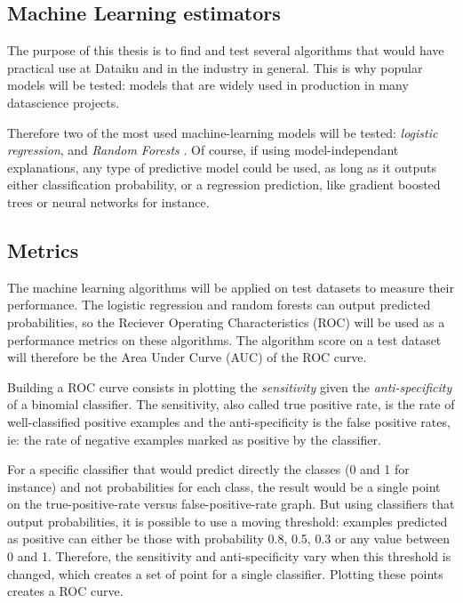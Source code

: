 \documentclass[a4paper,11pt]{kth-mag}
\begin{document}
\subsection{Machine Learning estimators}

The purpose of this thesis is to find and test several algorithms that would have practical use at Dataiku and in the industry in general. This is why popular models will be tested: models that are widely used in production in many datascience projects.

Therefore two of the most used machine-learning models will be tested: \textit{logistic regression}, and \textit{Random Forests} \cite{Breiman2001}. Of course, if using model-independant explanations, any type of predictive model could be used, as long as it outputs either classification probability, or a regression prediction, like gradient boosted trees or neural networks for instance.

\subsection{Metrics}

The machine learning algorithms will be applied on test datasets to measure their performance. The logistic regression and random forests can output predicted probabilities, so the Reciever Operating Characteristics (ROC) will be used as a performance metrics on these algorithms. The algorithm score on a test dataset will therefore be the Area Under Curve (AUC) of the ROC curve.

Building a ROC curve consists in plotting the \textit{sensitivity} given the \textit{anti-specificity} of a binomial classifier. The sensitivity, also called true positive rate, is the rate of well-classified positive examples and the anti-specificity is the false positive rates, ie: the rate of negative examples marked as positive by the classifier. 

For a specific classifier that would predict directly the classes (0 and 1 for instance) and not probabilities for each class, the result would be a single point on the true-positive-rate versus false-positive-rate graph. But using classifiers that output probabilities, it is possible to use a moving threshold: examples predicted as positive can either be those with probability 0.8, 0.5, 0.3 or any value between 0 and 1. Therefore, the sensitivity and anti-specificity vary when this threshold is changed, which creates a set of point for a single classifier. Plotting these points creates a ROC curve.
\end{document}
